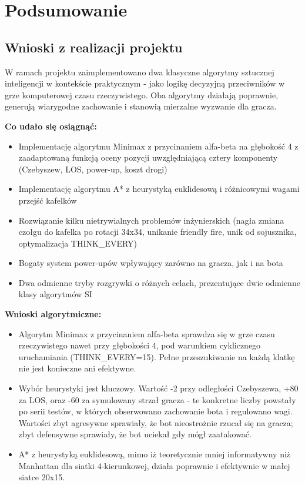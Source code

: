 \chapter{Podsumowanie}
\label{cha:Podsumowanie}

\section{Wnioski z realizacji projektu}

W ramach projektu zaimplementowano dwa klasyczne algorytmy sztucznej inteligencji w kontekście praktycznym - jako logikę 
decyzyjną przeciwników w grze komputerowej czasu rzeczywistego. Oba algorytmy działają poprawnie, generują wiarygodne 
zachowanie i stanowią mierzalne wyzwanie dla gracza.
 
\textbf{Co udało się osiągnąć:}
\begin{itemize}
    \item Implementację algorytmu Minimax z przycinaniem alfa-beta na głębokość 4 z zaadaptowaną funkcją oceny 
    pozycji uwzględniającą cztery komponenty (Czebyszew, LOS, power-up, koszt drogi)
    \item Implementację algorytmu A* z heurystyką euklidesową i różnicowymi wagami przejść kafelków
    \item Rozwiązanie kilku nietrywialnych problemów inżynierskich (nagła zmiana czołgu do kafelka po rotacji 34x34, unikanie 
    friendly fire, unik od sojusznika, optymalizacja THINK\_EVERY)
    \item Bogaty system power-upów wpływający zarówno na gracza, jak i na bota
    \item Dwa odmienne tryby rozgrywki o różnych celach, prezentujące dwie odmienne klasy algorytmów SI
\end{itemize}
 
\textbf{Wnioski algorytmiczne:}
\begin{itemize}
    \item Algorytm Minimax z przycinaniem alfa-beta sprawdza się w grze czasu rzeczywistego nawet przy głębokości 4, 
    pod warunkiem cyklicznego uruchamiania (THINK\_EVERY=15). Pełne przeszukiwanie na każdą klatkę nie jest konieczne ani efektywne.
    \item Wybór heurystyki jest kluczowy. Wartość -2 przy odległości Czebyszewa, +80 za LOS, oraz -60 za symulowany 
    strzał gracza - te konkretne liczby powstały po serii testów, w których obserwowano zachowanie bota i regulowano wagi. 
    Wartości zbyt agresywne sprawiały, że bot nieostrożnie rzucał się na gracza; zbyt defensywne sprawiały, że bot uciekał gdy 
    mógł zaatakować.
    \item A* z heurystyką euklidesową, mimo iż teoretycznie mniej informatywny niż Manhattan dla siatki 4-kierunkowej, działa 
    poprawnie i efektywnie w małej siatce 20x15.
\end{itemize}

